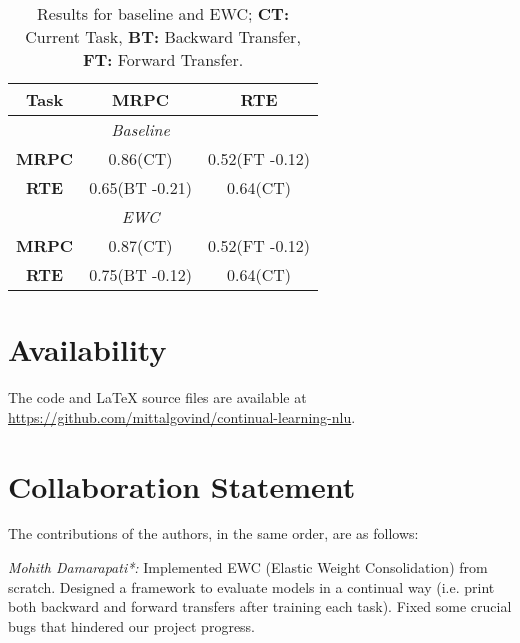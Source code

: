 \documentclass[11pt,a4paper]{article}
\begin{document}




\begin{table}[h!]
\centering
 \begin{tabular}{|c|c|c|} 
 \hline
 \textbf{Task} & \textbf{MRPC} & \textbf{RTE}  \\
 \hline\hline
 & \textit{Baseline} & \\
 \hline
 \textbf{MRPC} & 0.86(CT) & 0.52(FT -0.12) \\ 
 \hline
 \textbf{RTE} & 0.65(BT -0.21) & 0.64(CT) \\ %
 \hline
 & \textit{EWC} & \\ 
 \hline\hline
 \textbf{MRPC} & 0.87(CT) & 0.52(FT -0.12) \\ 
 \hline
 \textbf{RTE} & 0.75(BT -0.12) & 0.64(CT) \\ %
 \hline
\end{tabular}


\caption{\label{base-table} Results for baseline and EWC; \textbf{CT:} Current Task, \textbf{BT:} Backward Transfer, \textbf{FT:} Forward Transfer. 
 }
\end{table}

\section*{Availability}
The code and \LaTeX{} source files are available at \url{https://github.com/mittalgovind/continual-learning-nlu}.


\section*{Collaboration Statement}
The contributions of the authors, in the same order, are as follows:

\textit{Mohith Damarapati*:} Implemented EWC (Elastic Weight Consolidation) from scratch.  Designed a framework to evaluate models in a continual way (i.e. print both backward and forward transfers after training each task).  Fixed some crucial bugs that hindered our project progress. 
\end{document}
